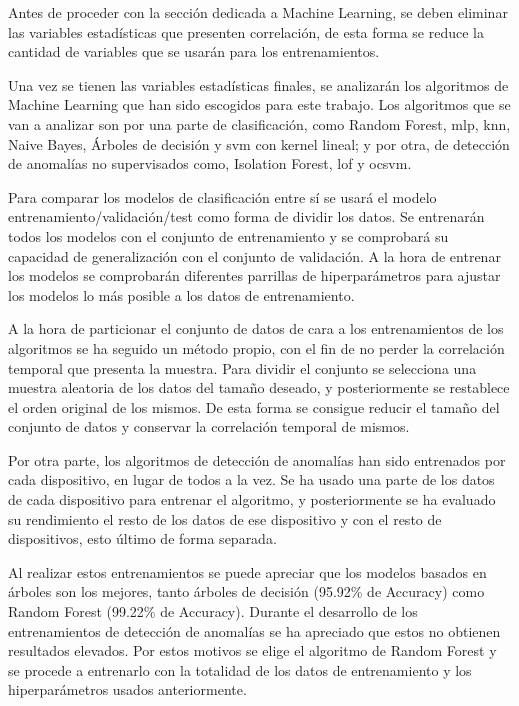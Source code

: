 Antes de proceder con la sección dedicada a Machine Learning, se deben eliminar las variables estadísticas que presenten correlación, de esta forma se reduce la cantidad de variables que se usarán para los entrenamientos.

Una vez se tienen las variables estadísticas finales, se analizarán los algoritmos de Machine Learning que han sido escogidos para este trabajo. Los algoritmos que se van a analizar son por una parte de clasificación, como Random Forest, \acrfull{mlp}, \acrfull{knn}, Naive Bayes, Árboles de decisión y \acrfull{svm} con kernel lineal; y por otra, de detección de anomalías no supervisados como, Isolation Forest, \acrfull{lof} y \acrfull{ocsvm}.

Para comparar los modelos de clasificación entre sí se usará el modelo entrenamiento/validación/test como forma de dividir los datos. Se entrenarán todos los modelos con el conjunto de entrenamiento y se comprobará su capacidad de generalización con el conjunto de validación. A la hora de entrenar los modelos se comprobarán diferentes parrillas de hiperparámetros para ajustar los modelos lo más posible a los datos de entrenamiento.

A la hora de particionar el conjunto de datos de cara a los entrenamientos de los algoritmos se ha seguido un método propio, con el fin de no perder la correlación temporal que presenta la muestra. Para dividir el conjunto se selecciona una muestra aleatoria de los datos del tamaño deseado, y posteriormente se restablece el orden original de los mismos. De esta forma se consigue reducir el tamaño del conjunto de datos y conservar la correlación temporal de mismos.

Por otra parte, los algoritmos de detección de anomalías han sido entrenados por cada dispositivo, en lugar de todos a la vez. Se ha usado una parte de los datos de cada dispositivo para entrenar el algoritmo, y posteriormente se ha evaluado su rendimiento el resto de los datos de ese dispositivo y con el resto de dispositivos, esto último de forma separada.

Al realizar estos entrenamientos se puede apreciar que los modelos basados en árboles son los mejores, tanto árboles de decisión (95.92\% de Accuracy) como Random Forest (99.22\% de Accuracy). Durante el desarrollo de los entrenamientos de detección de anomalías se ha apreciado que estos no obtienen resultados elevados. Por estos motivos se elige el algoritmo de Random Forest y se procede a entrenarlo con la totalidad de los datos de entrenamiento y los hiperparámetros usados anteriormente.

